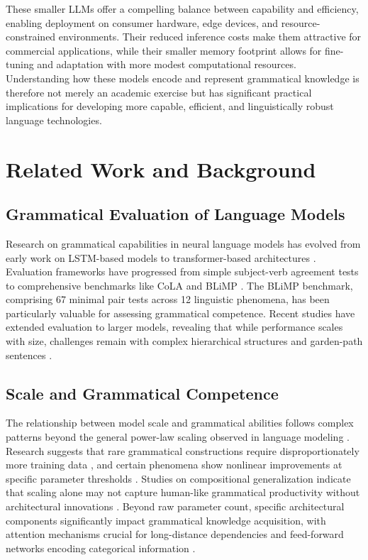 \documentclass{article}
\begin{document}
These smaller LLMs offer a compelling balance between capability and efficiency, enabling deployment on consumer hardware, edge devices, and resource-constrained environments. Their reduced inference costs make them attractive for commercial applications, while their smaller memory footprint allows for fine-tuning and adaptation with more modest computational resources. Understanding how these models encode and represent grammatical knowledge is therefore not merely an academic exercise but has significant practical implications for developing more capable, efficient, and linguistically robust language technologies.

\section{Related Work and Background}

\subsection{Grammatical Evaluation of Language Models}
Research on grammatical capabilities in neural language models has evolved from early work on LSTM-based models \citep{linzen2016assessing} to transformer-based architectures \citep{goldberg2019assessing, devlin2019bert}. Evaluation frameworks have progressed from simple subject-verb agreement tests to comprehensive benchmarks like CoLA \citep{warstadt2019neural} and BLiMP \citep{warstadt2020blimp}. The BLiMP benchmark, comprising 67 minimal pair tests across 12 linguistic phenomena, has been particularly valuable for assessing grammatical competence. Recent studies have extended evaluation to larger models, revealing that while performance scales with size, challenges remain with complex hierarchical structures and garden-path sentences \citep{thrush2022winograd, qian2022limitations}.

\subsection{Scale and Grammatical Competence}
The relationship between model scale and grammatical abilities follows complex patterns beyond the general power-law scaling observed in language modeling \citep{kaplan2020scaling}. Research suggests that rare grammatical constructions require disproportionately more training data \citep{wei2021frequency}, and certain phenomena show nonlinear improvements at specific parameter thresholds \citep{zhang2023language}. Studies on compositional generalization indicate that scaling alone may not capture human-like grammatical productivity without architectural innovations \citep{hu2020systematic}. Beyond raw parameter count, specific architectural components significantly impact grammatical knowledge acquisition, with attention mechanisms crucial for long-distance dependencies and feed-forward networks encoding categorical information \citep{patel2022mapping}.
\end{document}
